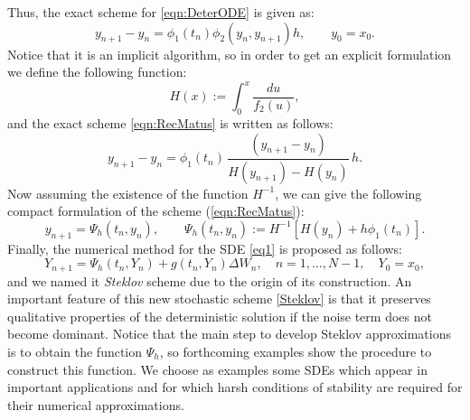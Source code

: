 	Thus, the exact scheme for \eqref{eqn:DeterODE} is given as:
	\begin{equation}\label{eqn:RecMatus}
		y_{n+1}-y_{n}=\phi_1(t_n)\phi_2(y_n,y_{n+1})h, \qquad y_0=x_0.
	\end{equation}
	Notice that it is an implicit algorithm, so in order to get an explicit formulation we
	define the following function:
	\begin{equation}\label{H}
		H(x):=\int_{0}^x \frac{du}{f_2(u)},
	\end{equation}
	and the exact scheme \eqref{eqn:RecMatus} is written  as follows:
	$$
		y_{n+1}-y_n=\phi_1(t_n)\,\frac{(y_{n+1}-y_n)}
		{H(y_{n+1})-H(y_n)}\,h.
	$$
	Now assuming the existence of the function $H^{-1}$,  we can give the following
	compact formulation of the scheme (\ref{eqn:RecMatus}):
	\begin{equation}
		y_{n+1}=\Psi_h(t_n,y_n),
		\qquad 
		\Psi_h(t_n,y_n):= H^{-1}[H(y_n)+h\phi_1(t_n)].
	\end{equation}    
	Finally, the numerical method for the SDE \eqref{eq1} is proposed as follows: 
	\begin{equation}\label{Steklov} 
		Y_{n+1}=\Psi_h(t_n,Y_n)+g(t_n,Y_n)\Delta W_n,
		\quad n=1,\dots,N-1, \quad 
		Y_0=x_0, 
	\end{equation}
	and we named it {\it Steklov} scheme due to the origin of its construction. An
	important feature of this new stochastic scheme \eqref{Steklov} is that it preserves
	qualitative properties of the deterministic solution if the noise term does not become
	dominant. Notice that the main step  to develop Steklov approximations is to obtain
	the function $\Psi_h$, so forthcoming examples show the procedure to construct this
	function. We choose as examples some SDEs which appear in important applications and
	for which harsh conditions of stability are required for their numerical
	approximations.
